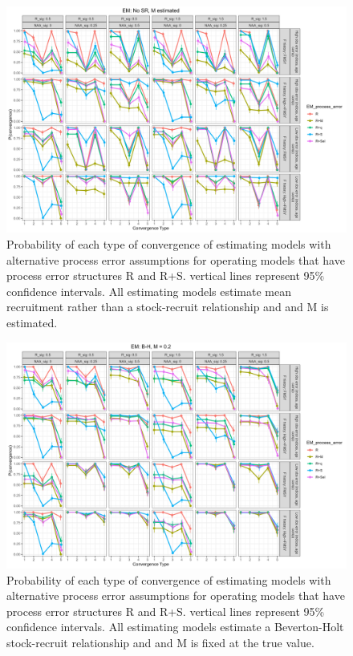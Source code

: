 \documentclass[
  12pt,
]{article}
\begin{document}
\begin{landscape}
\begin{figure}
\caption{Probability of each type of convergence of estimating models with alternative process error assumptions for operating models that have process error structures R and R+S. vertical lines represent 95\% confidence intervals. All estimating models estimate mean recruitment rather than a stock-recruit relationship and and M is estimated.}\label{naa_om_em_R_ME_convergence}
\begin{center}
\includegraphics[width = \textwidth]{naa_om_p_convergence_meanR_M_estimated.png}
\end{center}
\end{figure}
\end{landscape}

\begin{landscape}
\begin{figure}
\caption{Probability of each type of convergence of estimating models with alternative process error assumptions for operating models that have process error structures R and R+S. vertical lines represent 95\% confidence intervals. All estimating models estimate a Beverton-Holt stock-recruit relationship and and M is fixed at the true value.}\label{naa_om_em_BH_MF_convergence}
\begin{center}
\includegraphics[width = \textwidth]{naa_om_p_convergence_BH_M_fixed.png}
\end{center}
\end{figure}
\end{landscape}
\end{document}
